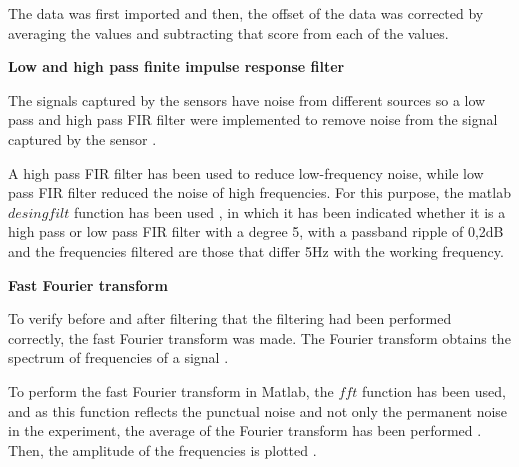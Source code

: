 \documentclass[12pt, a4paper]{article} %
\begin{document}
The data was first imported and then, the offset of the data was corrected by averaging the values and subtracting that score from each of the values. 

\setlength{\parindent}{8pt}
\setlength{\parskip}{4mm}

\setlength{\parindent}{0pt}
\setlength{\parskip}{8mm}
\textbf{Low and high pass finite impulse response filter}
\setlength{\parskip}{0mm}

The signals captured by the sensors have noise from different sources so a low pass and high pass FIR filter were implemented to remove noise from the signal captured by the sensor \cite{mondal2012novel}. 

\setlength{\parskip}{4mm}
\setlength{\parindent}{8pt}

A high pass FIR filter has been used to reduce low-frequency noise, while low pass FIR filter reduced the noise of high frequencies. For this purpose, the matlab $desingfilt$ function has been used \cite{jacob2015digital}, in which it has been indicated whether it is a high pass or low pass FIR filter with a degree 5, with a passband ripple of 0,2dB and the frequencies filtered are those that differ 5Hz with the working frequency.

\setlength{\parindent}{0pt}
\setlength{\parskip}{8mm}
\textbf{Fast Fourier transform}
\setlength{\parskip}{0mm}

To verify before and after filtering that the filtering had been performed correctly, the fast Fourier transform was made. The Fourier transform obtains the spectrum of frequencies of a signal \cite{de2001transformada}.

\setlength{\parskip}{4mm}
\setlength{\parindent}{8pt}

To perform the fast Fourier transform in Matlab, the $fft$ function has been used, and as this function reflects the punctual noise and not only the permanent noise in the experiment, the average of the Fourier transform has been performed \cite{shabaninezhad2021matlab}. Then, the amplitude of the frequencies is plotted \cite{FourierTransform, frigo1998fftw}.

\setlength{\parskip}{0mm}
\end{document}
